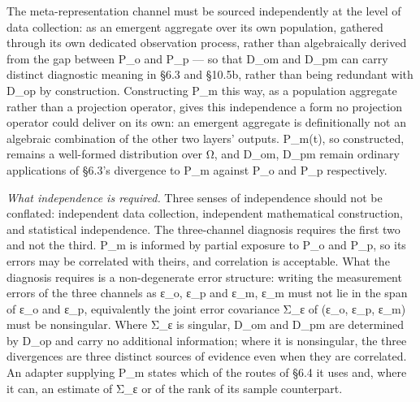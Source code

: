 \documentclass[
]{article}
\begin{document}
The meta-representation channel must be sourced independently at the
level of data collection: as an emergent aggregate over its own
population, gathered through its own dedicated observation process,
rather than algebraically derived from the gap between P\_o and P\_p ---
so that D\_om and D\_pm can carry distinct diagnostic meaning in §6.3
and §10.5b, rather than being redundant with D\_op by construction.
Constructing P\_m this way, as a population aggregate rather than a
projection operator, gives this independence a form no projection
operator could deliver on its own: an emergent aggregate is
definitionally not an algebraic combination of the other two layers'
outputs. P\_m(t), so constructed, remains a well-formed distribution
over Ω, and D\_om, D\_pm remain ordinary applications of §6.3's
divergence to P\_m against P\_o and P\_p respectively.

\emph{What independence is required.} Three senses of independence
should not be conflated: independent data collection, independent
mathematical construction, and statistical independence. The
three-channel diagnosis requires the first two and not the third. P\_m
is informed by partial exposure to P\_o and P\_p, so its errors may be
correlated with theirs, and correlation is acceptable. What the
diagnosis requires is a non-degenerate error structure: writing the
measurement errors of the three channels as ε\_o, ε\_p and ε\_m, ε\_m
must not lie in the span of ε\_o and ε\_p, equivalently the joint error
covariance Σ\_ε of (ε\_o, ε\_p, ε\_m) must be nonsingular. Where Σ\_ε is
singular, D\_om and D\_pm are determined by D\_op and carry no
additional information; where it is nonsingular, the three divergences
are three distinct sources of evidence even when they are correlated. An
adapter supplying P\_m states which of the routes of §6.4 it uses and,
where it can, an estimate of Σ\_ε or of the rank of its sample
counterpart.
\end{document}
